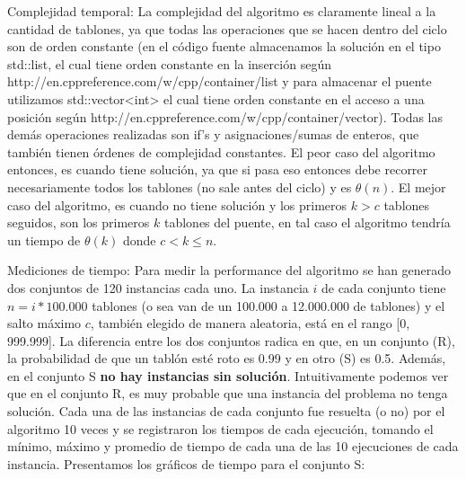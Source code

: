 \documentclass{article}
\begin{document}
\vspace{1.5cm}
{\noindent \Huge Complejidad temporal:}
\newline \newline
La complejidad del algoritmo es claramente lineal a la cantidad de tablones, ya que todas las operaciones que se hacen dentro del ciclo son de orden constante (en el c\'odigo fuente almacenamos la soluci\'on en el tipo std::list, el cual tiene orden constante en la inserci\'on seg\'un http://en.cppreference.com/w/cpp/container/list y para almacenar el puente utilizamos std::vector<int> el cual tiene orden constante en el acceso a una posici\'on seg\'un http://en.cppreference.com/w/cpp/container/vector). Todas las dem\'as operaciones realizadas son if's y asignaciones/sumas de enteros, que tambi\'en tienen \'ordenes de complejidad constantes.
\newline El peor caso del algoritmo entonces, es cuando tiene soluci\'on, ya que si pasa eso entonces debe recorrer necesariamente todos los tablones (no sale antes del ciclo) y es $\theta (n)$.
\newline El mejor caso del algoritmo, es cuando no tiene soluci\'on y los primeros $k > c$ tablones seguidos, son los primeros $k$ tablones del puente, en tal caso el algoritmo tendr\'ia un tiempo de $\theta (k)$ donde $c < k \le n$.

\vspace{1.5cm}
{\noindent \Huge Mediciones de tiempo:}
\newline \newline Para medir la performance del algoritmo se han generado dos conjuntos de 120 instancias cada uno. La instancia $i$ de cada conjunto tiene $n = i * 100.000$ tablones (o sea van de un 100.000 a 12.000.000 de tablones) y el salto m\'aximo $c$, tambi\'en elegido de manera aleatoria, est\'a en el rango [0, 999.999].
\newline La diferencia entre los dos conjuntos radica en que, en un conjunto (R), la probabilidad de que un tabl\'on est\'e roto es 0.99 y en otro (S) es 0.5. Adem\'as, en el conjunto S \textbf{no hay instancias sin soluci\'on}. Intuitivamente podemos ver que en el conjunto R, es muy probable que una instancia del problema no tenga soluci\'on.
\newline Cada una de las instancias de cada conjunto fue resuelta (o no) por el algoritmo 10 veces y se registraron los tiempos de cada ejecuci\'on, tomando el m\'inimo, m\'aximo y promedio de tiempo de cada una de las 10 ejecuciones de cada instancia.
\newline\newline Presentamos los gr\'aficos de tiempo para el conjunto S:
\end{document}
